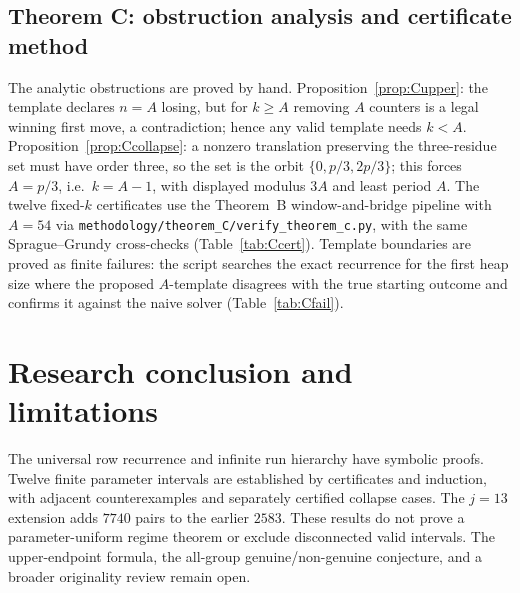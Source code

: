 \documentclass[11pt]{article}
\theoremstyle{remark}
\begin{document}
\subsection{Theorem C: obstruction analysis and certificate method}\label{sec:methodC}
The analytic obstructions are proved by hand. Proposition~\ref{prop:Cupper}: the template declares $n=A$ losing, but for $k\ge A$ removing $A$ counters is a legal winning first move, a contradiction; hence any valid template needs $k<A$. Proposition~\ref{prop:Ccollapse}: a nonzero translation preserving the three-residue set must have order three, so the set is the orbit $\{0,p/3,2p/3\}$; this forces $A=p/3$, i.e.\ $k=A-1$, with displayed modulus $3A$ and least period $A$.
The twelve fixed-$k$ certificates use the Theorem~B window-and-bridge pipeline with $A=54$ via \texttt{methodology/theorem\_C/verify\_theorem\_c.py}, with the same Sprague--Grundy cross-checks (Table~\ref{tab:Ccert}). Template boundaries are proved as finite failures: the script searches the exact recurrence for the first heap size where the proposed $A$-template disagrees with the true starting outcome and confirms it against the naive solver (Table~\ref{tab:Cfail}).

\section{Research conclusion and limitations}
The universal row recurrence and infinite run hierarchy have symbolic proofs. Twelve finite parameter intervals are established by certificates and induction, with adjacent counterexamples and separately certified collapse cases. The $j=13$ extension adds $7740$ pairs to the earlier $2583$. These results do not prove a parameter-uniform regime theorem or exclude disconnected valid intervals. The upper-endpoint formula, the all-group genuine/non-genuine conjecture, and a broader originality review remain open.
\end{document}
